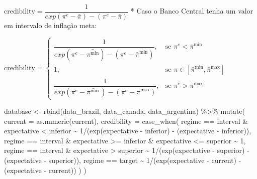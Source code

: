\documentclass[
]{article}
\newenvironment{Shaded}{\begin{snugshade}}{\end{snugshade}}
\newcommand{\AttributeTok}[1]{\textcolor[rgb]{0.77,0.63,0.00}{#1}}
\newcommand{\DecValTok}[1]{\textcolor[rgb]{0.00,0.00,0.81}{#1}}
\newcommand{\FunctionTok}[1]{\textcolor[rgb]{0.00,0.00,0.00}{#1}}
\newcommand{\NormalTok}[1]{#1}
\newcommand{\OtherTok}[1]{\textcolor[rgb]{0.56,0.35,0.01}{#1}}
\newcommand{\SpecialCharTok}[1]{\textcolor[rgb]{0.00,0.00,0.00}{#1}}
\newcommand{\StringTok}[1]{\textcolor[rgb]{0.31,0.60,0.02}{#1}}
\begin{document}
\(\text{credibility} = \dfrac{1}{exp(\pi^e - \bar{\pi}) - (\pi^e - \bar{\pi})}\)
* Caso o Banco Central tenha um valor em intervalo de inflação meta:

\(\text{credibility} = \begin{cases} \dfrac{1}{exp(\pi^e - \bar{\pi^{\min}}) - (\pi^e - \bar{\pi}^{\min})}, & \text{se } \pi^e<\bar{\pi}^{\min}\\ 1, & \text{se } \pi \in \left[\bar{\pi}^\min, \bar{\pi}^\max \right]\\ \dfrac{1}{exp(\pi^e - \bar{\pi^{\max}}) - (\pi^e - \bar{\pi}^{\max})}, & \text{se } \pi^e>\bar{\pi}^{\max} \end{cases}\)

\begin{Shaded}
\begin{Highlighting}[]
\NormalTok{database }\OtherTok{\textless{}{-}} \FunctionTok{rbind}\NormalTok{(data\_brazil, data\_canada, data\_argentina) }\SpecialCharTok{\%\textgreater{}\%} 
    \FunctionTok{mutate}\NormalTok{(}
    \AttributeTok{current =} \FunctionTok{as.numeric}\NormalTok{(current),}
    \AttributeTok{credibility =} \FunctionTok{case\_when}\NormalTok{(}
\NormalTok{      regime }\SpecialCharTok{==} \StringTok{\textquotesingle{}interval\textquotesingle{}} \SpecialCharTok{\&}\NormalTok{ expectative }\SpecialCharTok{\textless{}}\NormalTok{ inferior }\SpecialCharTok{\textasciitilde{}} \DecValTok{1}\SpecialCharTok{/}\NormalTok{(}\FunctionTok{exp}\NormalTok{(expectative }\SpecialCharTok{{-}}\NormalTok{ inferior) }\SpecialCharTok{{-}}\NormalTok{ (expectative }\SpecialCharTok{{-}}\NormalTok{ inferior)),}
\NormalTok{      regime }\SpecialCharTok{==} \StringTok{\textquotesingle{}interval\textquotesingle{}} \SpecialCharTok{\&}\NormalTok{ expectative }\SpecialCharTok{\textgreater{}=}\NormalTok{ inferior }\SpecialCharTok{\&}\NormalTok{ expectative }\SpecialCharTok{\textless{}=}\NormalTok{ superior }\SpecialCharTok{\textasciitilde{}} \DecValTok{1}\NormalTok{,}
\NormalTok{      regime }\SpecialCharTok{==} \StringTok{\textquotesingle{}interval\textquotesingle{}} \SpecialCharTok{\&}\NormalTok{ expectative }\SpecialCharTok{\textgreater{}}\NormalTok{ superior }\SpecialCharTok{\textasciitilde{}} \DecValTok{1}\SpecialCharTok{/}\NormalTok{(}\FunctionTok{exp}\NormalTok{(expectative }\SpecialCharTok{{-}}\NormalTok{ superior) }\SpecialCharTok{{-}}\NormalTok{ (expectative }\SpecialCharTok{{-}}\NormalTok{ superior)),}
\NormalTok{      regime }\SpecialCharTok{==} \StringTok{\textquotesingle{}target\textquotesingle{}} \SpecialCharTok{\textasciitilde{}} \DecValTok{1}\SpecialCharTok{/}\NormalTok{(}\FunctionTok{exp}\NormalTok{(expectative }\SpecialCharTok{{-}}\NormalTok{ current) }\SpecialCharTok{{-}}\NormalTok{ (expectative }\SpecialCharTok{{-}}\NormalTok{ current)) }
\NormalTok{    )}
\NormalTok{  )}
\end{Highlighting}
\end{Shaded}
\end{document}
